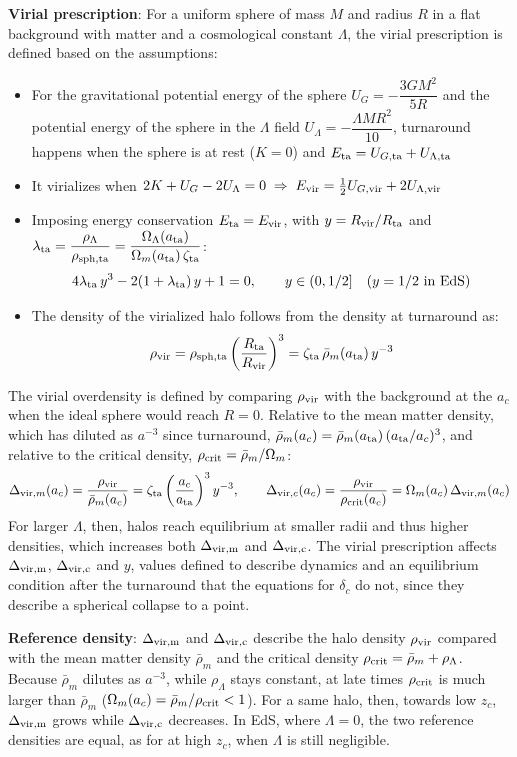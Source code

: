 \documentclass[11pt,a4paper]{article}
\begin{document}
\textbf{Virial prescription}: For a uniform sphere of mass $M$ and radius $R$ in a flat background with matter and a cosmological constant $\Lambda$, the virial prescription is defined based on the assumptions:
\begin{itemize}
\item For the gravitational potential energy of the sphere $U_G = -\dfrac{3GM^2}{5R}$ and the potential energy of the sphere in the $\Lambda$ field $U_\Lambda = -\dfrac{\Lambda M R^2}{10}$, turnaround happens when the sphere is at rest ($K=0$) and $E_{\rm ta} = U_{G,\rm ta} + U_{\Lambda,\rm ta}$
\item It virializes when $2K + U_G - 2U_\Lambda = 0 \;\Rightarrow\; E_{\rm vir} = \tfrac12 U_{G,\rm vir} + 2U_{\Lambda,\rm vir}$
\item Imposing energy conservation $E_{\rm ta}=E_{\rm vir}$, with $y = R_{\rm vir}/R_{\rm ta}$ and $\lambda_{\rm ta} = \dfrac{\rho_\Lambda}{\rho_{\rm sph,ta}} = \dfrac{\Omega_\Lambda(a_{\rm ta})}{\Omega_m(a_{\rm ta})\,\zeta_{\rm ta}}$:
$$4\lambda_{\rm ta}\,y^3 - 2(1+\lambda_{\rm ta})\,y + 1 = 0, \qquad y\in(0,1/2] \quad (y=1/2 \text{ in EdS})$$
\item The density of the virialized halo follows from the density at turnaround as:
$$\rho_{\rm vir} = \rho_{\rm sph,ta}\left(\frac{R_{\rm ta}}{R_{\rm vir}}\right)^3 = \zeta_{\rm ta}\,\bar\rho_m(a_{\rm ta})\,y^{-3}$$
\end{itemize}
The virial overdensity is defined by comparing $\rho_{\rm vir}$ with the background at the $a_c$ when the ideal sphere would reach $R=0$. Relative to the mean matter density, which has diluted as $a^{-3}$ since turnaround, $\bar\rho_m(a_c) = \bar\rho_m(a_{\rm ta})\,(a_{\rm ta}/a_c)^3$, and relative to the critical density, $\rho_{\rm crit} = \bar\rho_m/\Omega_m$:
$$\Delta_{{\rm vir},m}(a_c) = \frac{\rho_{\rm vir}}{\bar\rho_m(a_c)} = \zeta_{\rm ta}\left(\frac{a_c}{a_{\rm ta}}\right)^3 y^{-3}, \qquad
\Delta_{{\rm vir},c}(a_c) = \frac{\rho_{\rm vir}}{\rho_{\rm crit}(a_c)} = \Omega_m(a_c)\,\Delta_{{\rm vir},m}(a_c)$$
For larger $\Lambda$, then, halos reach equilibrium at smaller radii and thus higher densities, which increases both $\Delta_{\rm vir,m}$ and $\Delta_{\rm vir,c}$. The virial prescription affects $\Delta_{\rm vir,m}$, $\Delta_{\rm vir,c}$ and $y$, values defined to describe dynamics and an equilibrium condition after the turnaround that the equations for $\delta_c$ do not, since they describe a spherical collapse to a point.

\textbf{Reference density}: $\Delta_{\rm vir,m}$ and $\Delta_{\rm vir,c}$ describe the halo density $\rho_{\rm vir}$ compared with the mean matter density $\bar\rho_m$ and the critical density $\rho_{\rm crit}=\bar\rho_m+\rho_\Lambda$. Because $\bar\rho_m$ dilutes as $a^{-3}$, while $\rho_\Lambda$ stays constant, at late times $\rho_{\rm crit}$ is much larger than $\bar\rho_m$ ($\Omega_m(a_c)=\bar\rho_m/\rho_{\rm crit}<1$). For a same halo, then, towards low $z_c$, $\Delta_{\rm vir,m}$ grows while $\Delta_{\rm vir,c}$ decreases. In EdS, where $\Lambda=0$, the two reference densities are equal, as for at high $z_c$, when $\Lambda$ is still negligible.
\end{document}
